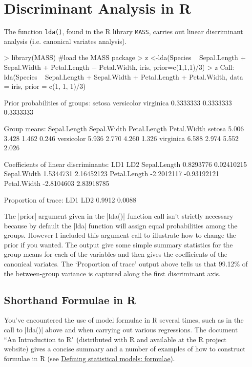 
\section{Discriminant Analysis in R}

The function \texttt{lda()}, found in the R library \texttt{MASS}, carries out linear discriminant analysis (i.e. canonical variates analysis).


\begin{R}
> library(MASS) #load the MASS package
> z <-lda(Species ~ Sepal.Length + Sepal.Width + Petal.Length + Petal.Width, iris, prior=c(1,1,1)/3)
> z
Call:
lda(Species ~ Sepal.Length + Sepal.Width + Petal.Length + Petal.Width,
    data = iris, prior = c(1, 1, 1)/3)

Prior probabilities of groups:
    setosa versicolor  virginica
 0.3333333  0.3333333  0.3333333

Group means:
           Sepal.Length Sepal.Width Petal.Length Petal.Width
setosa            5.006       3.428        1.462       0.246
versicolor        5.936       2.770        4.260       1.326
virginica         6.588       2.974        5.552       2.026

Coefficients of linear discriminants:
                    LD1         LD2
Sepal.Length  0.8293776  0.02410215
Sepal.Width   1.5344731  2.16452123
Petal.Length -2.2012117 -0.93192121
Petal.Width  -2.8104603  2.83918785

Proportion of trace:
   LD1    LD2
0.9912 0.0088
\end{R}

The |prior| argument given in the |lda()| function call isn't strictly necessary because by default the |lda| function will assign equal probabilities among the groups. However I included this argument call to illustrate how to change the prior if you wanted. The output give some simple summary statistics for the group means for each of the variables and then gives the coefficients of the canonical variates.  The `Proportion of trace' output above tells us that 99.12\% of the between-group variance is captured along the first discriminant axis.

\subsection{Shorthand Formulae in R}

You've encountered the use of model formulae in R several times, such as in the call to |lda()| above and when carrying out various regressions.  The document ``An Introduction to R" (distributed with R and available at the R project website) gives a concise summary and a number of examples of how to construct formulae in R (see \href{http://cran.r-project.org/doc/manuals/R-intro.html#Formulae-for-statistical-models}{Defining statistical models: formulae}).

